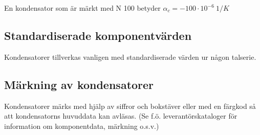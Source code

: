 En kondensator som är märkt med N 100 betyder
\(\alpha _c = -100 \cdot 10^{-6}\ 1/K\)

\subsection{Standardiserade komponentvärden}

Kondensatorer tillverkas vanligen med standardiserade värden ur någon talserie.

\subsection{Märkning av kondensatorer}

Kondensatorer märks med hjälp av siffror och bokstäver eller med en färgkod så att
kondensatorns huvuddata kan avläsas.
(Se f.ö. leverantörskataloger för information om komponentdata, märkning o.s.v.)
